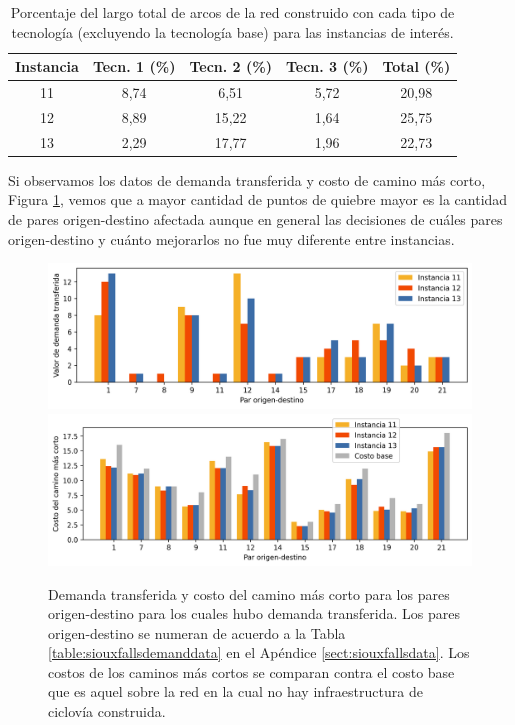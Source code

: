  \begin{table}[h!]
  \centering
  \begin{tabular}{ccccc}
    \toprule
      Instancia & Tecn. 1 (\%) & Tecn. 2 (\%) & Tecn. 3 (\%) & Total (\%) \\
    \midrule
      11 & 8,74  & 6,51   & 5,72 & 20,98 \\
      12 & 8,89  & 15,22  & 1,64 & 25,75 \\
      13 & 2,29  & 17,77  & 1,96 & 22,73 \\
    \bottomrule
  \end{tabular}
  \caption{Porcentaje del largo total de arcos de la red construido con cada tipo de tecnología (excluyendo la tecnología base) para las instancias de interés.}\label{table:sensibilityinfralengths}
\end{table}

Si observamos los datos de demanda transferida y costo de camino más corto, Figura \ref{fig:sensibilitybyodpair_11_12_13}, vemos que a mayor cantidad de puntos de quiebre mayor es la cantidad de pares origen-destino afectada aunque en general las decisiones de cuáles pares origen-destino y cuánto mejorarlos no fue muy diferente entre instancias.

\begin{figure}[h!]
  \centering
  \includegraphics[width=12cm]{../resources/sensibility_case_study_demand.png}
  \includegraphics[width=12cm]{../resources/sensibility_case_study_shortest_paths.png}
  \caption{Demanda transferida y costo del camino más corto para los pares origen-destino para los cuales hubo demanda transferida. Los pares origen-destino se numeran de acuerdo a la Tabla \ref{table:siouxfallsdemanddata} en el Apéndice \ref{sect:siouxfallsdata}. Los costos de los caminos más cortos se comparan contra el costo base que es aquel sobre la red en la cual no hay infraestructura de ciclovía construida.}
  \label{fig:sensibilitybyodpair_11_12_13}
\end{figure}

